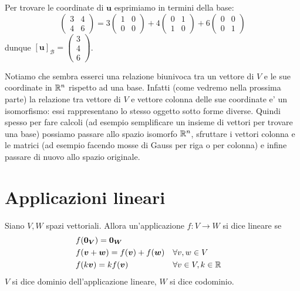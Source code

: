 \begin{solution}
    Per trovare le coordinate di $\bm{u}$ esprimiamo in termini della base:
    \begin{equation*}
        \begin{pmatrix}
            3 & 4 \\ 4 & 6
        \end{pmatrix} = 3\begin{pmatrix} 1&0\\0&0 \end{pmatrix} + 4\begin{pmatrix} 0&1\\1&0 \end{pmatrix} + 6\begin{pmatrix} 0&0\\0&1 \end{pmatrix}
    \end{equation*}
    dunque $[\bm{u}]_{\mathcal{B}} = \begin{pmatrix}
        3 \\ 4 \\ 6
    \end{pmatrix}$.
\end{solution}

Notiamo che sembra esserci una relazione biunivoca tra un vettore di $V$ e le sue coordinate in $\mathbb{R}^n$ rispetto ad una base. Infatti (come vedremo nella prossima parte) la relazione tra vettore di $V$ e vettore colonna delle sue coordinate e' un isomorfismo: essi rappresentano lo stesso oggetto sotto forme diverse. Quindi spesso per fare calcoli (ad esempio semplificare un insieme di vettori per trovare una base) possiamo passare allo spazio isomorfo $\mathbb{R}^n$, sfruttare i vettori colonna e le matrici (ad esempio facendo mosse di Gauss per riga o per colonna) e infine passare di nuovo allo spazio originale.

\section{Applicazioni lineari}

\begin{definition}
    Siano $V, W$ spazi vettoriali. Allora un'applicazione $f : V \to W$ si dice lineare
    se
    \begin{align}
        &f(\bm{0_V}) = \bm{0_W} \\
        &f(\bm{v} + \bm{w}) = f(\bm{v}) + f(\bm{w}) &&\forall v, w \in V \\
        &f(k\bm{v}) = kf(\bm{v})                    &&\forall v\in V, k \in \mathbb{R} 
    \end{align}
    $V$ si dice dominio dell'applicazione lineare, $W$ si dice codominio.
\end{definition}

